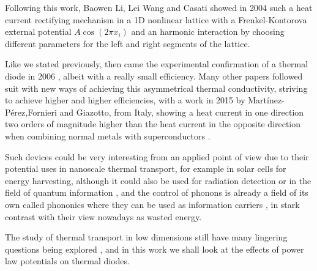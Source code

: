 Following this work, Baowen Li, Lei Wang and Casati showed in 2004  \cite{liThermalDiode2004} such a heat current rectifying mechanism in a 1D nonlinear lattice with a Frenkel-Kontorova external potential $ A\cos(2\pi x_{i}) $ and an harmonic interaction by choosing different parameters for the left and right segments of the lattice.

Like we stated previously, then came the experimental confirmation of a thermal diode in 2006 \cite{changSolidStateThermal2006}, albeit with a really small efficiency. Many other papers followed suit with new ways of achieving this asymmetrical thermal conductivity, striving to achieve higher and higher efficiencies, with a work in 2015 by Martínez-Pérez,Fornieri and Giazotto, from Italy, showing a heat current in one direction two orders of magnitude higher than the heat current in the opposite direction when combining normal metals with superconductors \cite{martinez-perezRectificationElectronic2015}.

Such devices could be very interesting from an applied point of view due to their potential uses in nanoscale thermal transport, for example in solar cells for energy harvesting, although it could also be used for radiation detection or in the field of quantum information \cite{martinez-perezRectificationElectronic2015}, and the control of phonons is already a field of its own called phononics where they can be used as information carriers \cite{liPhononicsManipulating2012}, in stark contrast with their view nowadays as wasted energy.

The study of thermal transport in low dimensions still have many lingering questions being explored \cite{olivaresRoleRange2016}, and in this work we shall look at the effects of power law potentials on thermal diodes.
